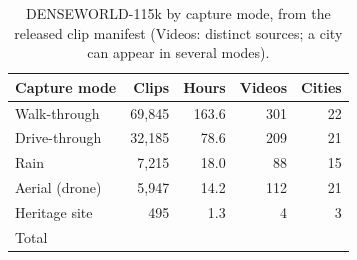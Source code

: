 \begin{table}[t]
\centering
\small
\setlength{\tabcolsep}{4pt}
\begin{tabular}{lrrrr}
\toprule
Capture mode & Clips & Hours & Videos & Cities \\
\midrule
Walk-through & 69,845 & 163.6 & 301 & 22 \\
Drive-through & 32,185 & 78.6 & 209 & 21 \\
Rain & 7,215 & 18.0 & 88 & 15 \\
Aerial (drone) & 5,947 & 14.2 & 112 & 21 \\
Heritage site & 495 & 1.3 & 4 & 3 \\
\midrule
Total & \nClips{} & \nHours{} & \nVideos{} & \nCities{} \\
\bottomrule
\end{tabular}
\caption{DENSEWORLD-115k by capture mode, from the released clip manifest (Videos: distinct sources; a city can appear in several modes).}
\label{tab:composition}
\end{table}

